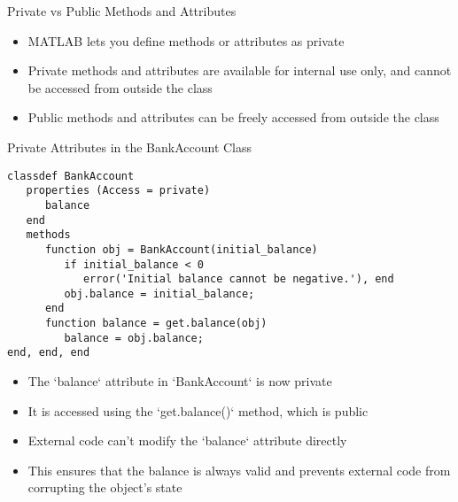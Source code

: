 \documentclass[handout]{beamer}
\begin{document}
\begin{frame}[fragile]{Private vs Public Methods and Attributes}
  \begin{itemize}
    \item MATLAB lets you define methods or attributes as private
    \item Private methods and attributes are available for internal use only, and cannot be accessed from outside the class
    \item Public methods and attributes can be freely accessed from outside the class
  \end{itemize}
\end{frame}

\begin{frame}[fragile]{Private Attributes in the BankAccount Class}
\begin{lstlisting}[style=Matlab]
classdef BankAccount
   properties (Access = private)
      balance
   end
   methods
      function obj = BankAccount(initial_balance)
         if initial_balance < 0
            error('Initial balance cannot be negative.'), end
         obj.balance = initial_balance;
      end
      function balance = get.balance(obj)
         balance = obj.balance;
end, end, end
\end{lstlisting}

  \begin{itemize}
    \item The `balance` attribute in `BankAccount` is now private
    \item It is accessed using the `get.balance()` method, which is public
    \item External code can't modify the `balance` attribute directly
    \item This ensures that the balance is always valid and prevents external code from corrupting the object's state
  \end{itemize}
\end{frame}
\end{document}
